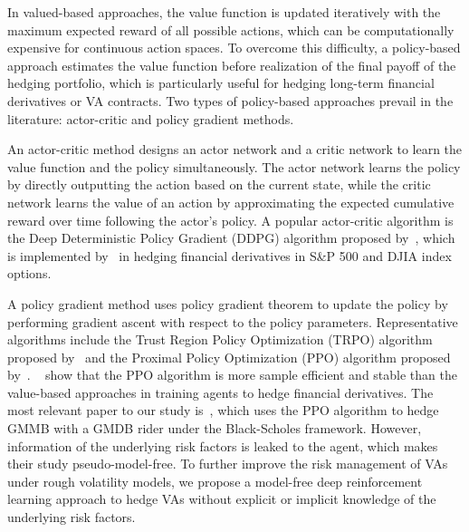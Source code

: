 In valued-based approaches, the value function is updated iteratively with the maximum expected reward of all possible actions, which can be computationally expensive for continuous action spaces.
To overcome this difficulty, a policy-based approach estimates the value function before realization of the final payoff of the hedging portfolio, which is particularly useful for hedging long-term financial derivatives or VA contracts.
Two types of policy-based approaches prevail in the literature: actor-critic and policy gradient methods.

An actor-critic method designs an actor network and a critic network to learn the value function and the policy simultaneously.
The actor network learns the policy by directly outputting the action based on the current state, while the critic network learns the value of an action by approximating the expected cumulative reward over time following the actor's policy.
A popular actor-critic algorithm is the Deep Deterministic Policy Gradient (DDPG) algorithm proposed by~\cite{lillicrap2015continuous}, which is implemented by~\cite{xu2022delta} in hedging financial derivatives in S\&P 500 and DJIA index options.

A policy gradient method uses policy gradient theorem to update the policy by performing gradient ascent with respect to the policy parameters.
Representative algorithms include the Trust Region Policy Optimization (TRPO) algorithm proposed by~\cite{schulman2015trust} and the Proximal Policy Optimization (PPO) algorithm proposed by~\cite{schulman2017proximal}.
~\cite{du2020deep} show that the PPO algorithm is more sample efficient and stable than the value-based approaches in training agents to hedge financial derivatives.
The most relevant paper to our study is~\cite{chong2023pseudo}, which uses the PPO algorithm to hedge GMMB with a GMDB rider under the Black-Scholes framework.
However, information of the underlying risk factors is leaked to the agent, which makes their study pseudo-model-free.
To further improve the risk management of VAs under rough volatility models, we propose a model-free deep reinforcement learning approach to hedge VAs without explicit or implicit knowledge of the underlying risk factors.


